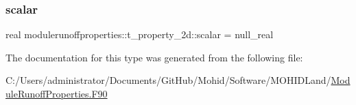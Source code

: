 \mbox{\label{structmodulerunoffproperties_1_1t__property__2d_aaaa6236ca355bc5cf32d51531fcce2e1}} 
\subsubsection{\texorpdfstring{scalar}{scalar}}
{\footnotesize\ttfamily real modulerunoffproperties\+::t\+\_\+property\+\_\+2d\+::scalar = null\+\_\+real\hspace{0.3cm}{\ttfamily [private]}}



The documentation for this type was generated from the following file\+:\begin{DoxyCompactItemize}
\item 
C\+:/\+Users/administrator/\+Documents/\+Git\+Hub/\+Mohid/\+Software/\+M\+O\+H\+I\+D\+Land/\mbox{\hyperlink{_module_runoff_properties_8_f90}{Module\+Runoff\+Properties.\+F90}}\end{DoxyCompactItemize}
